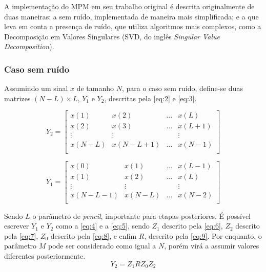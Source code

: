 \documentclass[12pt]{article}
\begin{document}
A implementação do MPM em seu trabalho original é descrita originalmente de duas maneiras: a sem ruído, 
implementada de maneira mais simplificada; e a que leva em conta a presença de ruído, que utiliza algoritmos mais complexos, como a
Decomposição em Valores Singulares (SVD, do inglês \textit{Singular Value Decomposition}).

\subsubsection{Caso sem ruído}
Assumindo um sinal $x$ de tamanho $N$, para o caso sem ruído, define-se duas matrizes $(N-L) \times L$, $Y_1$ e $Y_2$, descritas pela \autoref{eq:2} e \autoref{eq:3}.

\begin{equation} \label{eq:2}
    Y_2 = \begin{bmatrix} x(1) & x(2) & \dots & x(L) \\
                            x(2) & x(3) & \dots & x(L + 1) \\
                            \vdots & \vdots & & \vdots \\
                            x(N-L) & x(N - L + 1) & \dots & x(N-1) \\
    \end{bmatrix}
\end{equation}

\begin{equation} \label{eq:3}
    Y_1 = \begin{bmatrix} x(0) & x(1) & \dots & x(L-1) \\
                            x(1) & x(2) & \dots & x(L) \\
                            \vdots & \vdots & & \vdots \\
                            x(N - L - 1) & x(N - L) & \dots & x(N-2) \\
    \end{bmatrix}
\end{equation}

Sendo $L$ o parâmetro de \textit{pencil}, importante para etapas posteriores. É possível escrever $Y_1$ e $Y_2$ como a \autoref{eq:4} e a \autoref{eq:5}, sendo $Z_1$ descrito pela \autoref{eq:6}, $Z_2$ descrito pela \autoref{eq:7}, $Z_0$ 
descrito pela \autoref{eq:8}, e enfim $R$, descrito pela \autoref{eq:9}. Por enquanto, o parâmetro $M$ pode ser considerado como igual a $N$, porém virá a assumir valores diferentes posteriormente.
\begin{equation} \label{eq:4}
    Y_2 = Z_1 R Z_0 Z_2
\end{equation}
\end{document}
